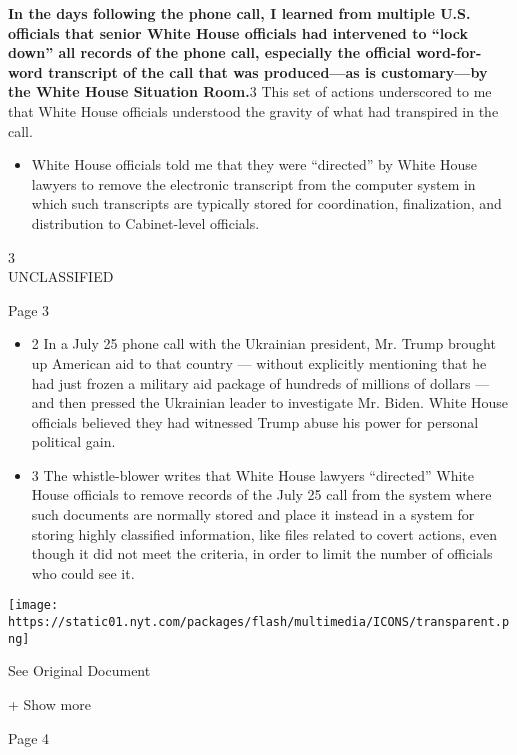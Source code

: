 \textbf{In the days following the phone call, I learned from multiple
U.S. officials that senior White House officials had intervened to
``lock down'' all records of the phone call, especially the official
word-for-word transcript of the call that was produced---as is
customary---by the White House Situation Room.}3 This set of actions
underscored to me that White House officials understood the gravity of
what had transpired in the call.

\begin{itemize}
\tightlist
\item
  White House officials told me that they were ``directed'' by White
  House lawyers to remove the electronic transcript from the computer
  system in which such transcripts are typically stored for
  coordination, finalization, and distribution to Cabinet-level
  officials.
\end{itemize}

3\\
UNCLASSIFIED

Page 3

\begin{itemize}
\tightlist
\item
  2 In a July 25 phone call with the Ukrainian president, Mr. Trump
  brought up American aid to that country --- without explicitly
  mentioning that he had just frozen a military aid package of hundreds
  of millions of dollars --- and then pressed the Ukrainian leader to
  investigate Mr. Biden. White House officials believed they had
  witnessed Trump abuse his power for personal political gain.
\item
  3 The whistle-blower writes that White House lawyers ``directed''
  White House officials to remove records of the July 25 call from the
  system where such documents are normally stored and place it instead
  in a system for storing highly classified information, like files
  related to covert actions, even though it did not meet the criteria,
  in order to limit the number of officials who could see it.
\end{itemize}

\protect\hyperlink{}{}

\texttt{[image: https://static01.nyt.com/packages/flash/multimedia/ICONS/transparent.png]}

See Original Document

+ Show more

Page 4

\protect\hyperlink{}{}


